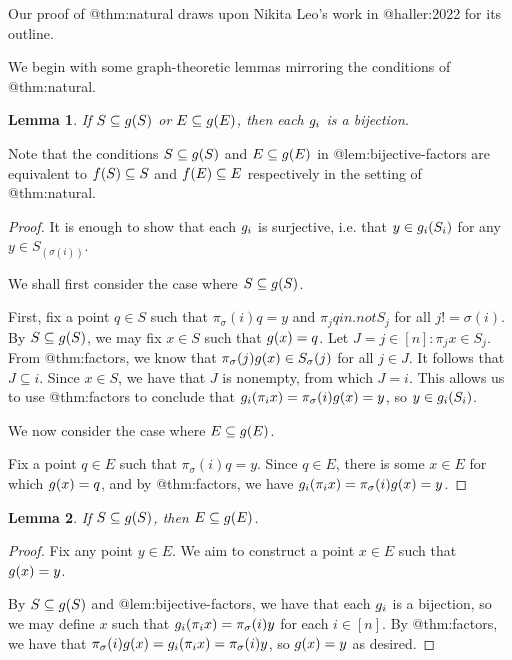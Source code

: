 \documentclass{amsart}
\newtheorem{lemma}{Lemma}
\theoremstyle{definition}
\begin{document}
Our proof of @thm:natural draws upon Nikita Leo's work in @haller:2022
for its outline.

We begin with some graph-theoretic lemmas mirroring the conditions of @thm:natural.

\begin{lemma} \label{lem:bijective-factors}
    If $S \subseteq g(S)$ or $E \subseteq g(E)$, then each $g_i$ is a bijection.
\end{lemma}

Note that the conditions $S \subseteq g(S)$ and $E \subseteq g(E)$ in @lem:bijective-factors are equivalent to $f(S) \subseteq S$ and $f(E) \subseteq E$ respectively in the setting of @thm:natural.

\begin{proof}
    It is enough to show that each $g_i$ is surjective, i.e. that $y \in g_i (S_i)$ for any $y \in S_(\sigma(i))$.

    We shall first consider the case where $S \subseteq g(S)$.
  
    First, fix a point $q \in S$ such that $\pi_\sigma(i) q = y$ and $\pi_j q in.not S_j$ for all $j != \sigma(i)$. By $S \subseteq g(S)$, we may fix $x \in S$ such that $g(x) = q$. Let $J = {j \in [n] : \pi_j x \in S_j}$. From @thm:factors, we know that $\pi_\sigma(j) g(x) \in S_\sigma(j)$ for all $j \in J$. It follows that $J \subseteq {i}$. Since $x \in S$, we have that $J$ is nonempty, from which $J = {i}$. This allows us to use @thm:factors to conclude that $g_i (\pi_i x) = \pi_\sigma(i) g(x) = y$, so $y \in g_i (S_i)$.
  
    We now consider the case where $E \subseteq g(E)$.
  
    Fix a point $q \in E$ such that $\pi_\sigma(i) q = y$. Since $q \in E$, there is some $x \in E$ for which $g(x) = q$, and by @thm:factors, we have $g_i (\pi_i x) = \pi_\sigma(i) g(x) = y$.
\end{proof}

\begin{lemma} \label{lem:sphere-implies-extreme}
    If $S \subseteq g(S)$, then $E \subseteq g(E)$.
\end{lemma}

\begin{proof}
    Fix any point $y \in E$. We aim to construct a point $x \in E$ such that $g(x)=y$.

    By $S \subseteq g(S)$ and @lem:bijective-factors, we have that each $g_i$ is a bijection, so we may define $x$ such that $g_i (\pi_i x) = \pi_\sigma(i) y$ for each $i \in [n]$. By @thm:factors, we have that $\pi_\sigma(i) g(x) = g_i (\pi_i x) = \pi_\sigma(i) y$, so $g(x) = y$ as desired.  
\end{proof}
\end{document}
